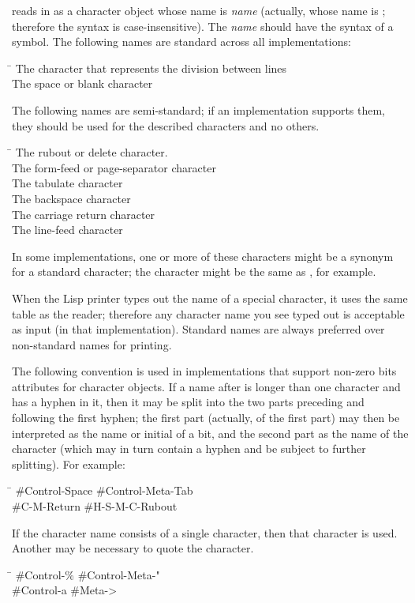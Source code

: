 \begin{flushdesc}
 reads in as a character object whose name is \emph{name}
(actually, whose name is ;
therefore the syntax is case-insensitive).
The \emph{name} should have the syntax of a symbol.
The following names are standard across all implementations:
\begin{tabbing}
\hskip 7pc\=\kill
{}\>The character that represents the division between lines \\
\>The space or blank character
\end{tabbing}
The following names are semi-standard; if an implementation supports
them, they should be used for the described characters and no others.
\begin{tabbing}
\hskip 7pc\=\kill
{}\>The rubout or delete character.\\
\>The form-feed or page-separator character \\
\>The tabulate character \\
\>The backspace character \\
\>The carriage return character \\
\>The line-feed character
\end{tabbing}
In some implementations, one or more of these characters might be
a synonym for a standard character; the  character
might be the same as , for example.

When the Lisp printer types out the name of a special character, it uses the
same table as the \cd{\#{\Xbackslash}} reader; therefore any character name you see typed out
is acceptable as input (in that implementation).  Standard names are always
preferred over non-standard names for printing.

The following convention is used in implementations that support
non-zero bits attributes for character objects.
If a name after \cd{\#{\Xbackslash}} is longer than one character and has a hyphen in it,
then it may be split into the two parts preceding
and following the first hyphen; the first part (actually, 
of the first part)
may then be interpreted as
the name or initial of a bit, and the second part as the name of the character
(which may in turn contain a hyphen and be subject to further splitting).
For example:
\begin{lisp}
\hskip10pc\=\kill
\#{\Xbackslash}Control-Space			\>\#{\Xbackslash}Control-Meta-Tab \\
\#{\Xbackslash}C-M-Return			\>\#{\Xbackslash}H-S-M-C-Rubout
\end{lisp}
If the character name consists of a single character, then that character
is used.  Another \cd{{\Xbackslash}} may be necessary to quote the character.
\begin{lisp}
\hskip10pc\=\kill
\#{\Xbackslash}Control-\%			\>\#{\Xbackslash}Control-Meta-{\Xbackslash}" \\
\#{\Xbackslash}Control-{\Xbackslash}a			\>\#{\Xbackslash}Meta->
\end{lisp}


\end{flushdesc}
